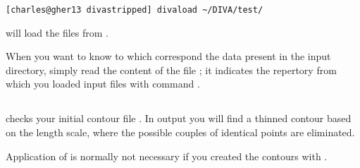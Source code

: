 \example
\begin{lstlisting}[style=Bash]
[charles@gher13 divastripped] divaload ~/DIVA/test/
\end{lstlisting}
will load the files from .
 

\btips
When you want to know to which correspond the data present in the input directory, simply read the content of the file ; it indicates the repertory from which you loaded input files with command .
\etips


\subsection{}

 checks your initial contour file . In output  you will find a thinned contour based on the length scale, where the possible couples of identical points are eliminated.

Application of  is normally not necessary if you created the contours with .
